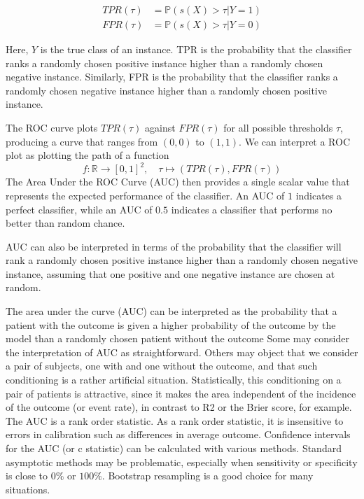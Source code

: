     	\begin{align*}
    		TPR(\tau) &= \mathbb{P}(s(X) > \tau | Y = 1) \\
    		FPR(\tau) &= \mathbb{P}(s(X) > \tau | Y = 0)
    	\end{align*}
	
	Here, $Y$ is the true class of an instance. 
	TPR is the probability that the classifier ranks a randomly chosen positive instance higher than a randomly chosen negative instance. 
	Similarly, FPR is the probability that the classifier ranks a randomly chosen negative instance higher than a randomly chosen positive instance.
    
    	
	The ROC curve plots $TPR(\tau)$ against $FPR(\tau)$ for all possible thresholds $\tau$, producing a curve that ranges from $(0,0)$ to $(1,1)$.
	We can interpret a ROC plot as plotting the path of a function
	\[
		f: \mathbb{R} \to [0,1]^2, \quad  \tau \mapsto (TPR(\tau), FPR(\tau))
	\]
	The Area Under the ROC Curve (AUC) then provides a single scalar value that represents the expected performance of the classifier.
	An AUC of $1$ indicates a perfect classifier, while an AUC of $0.5$ indicates a classifier that performs no better than random chance.
	
	AUC can also be interpreted in terms of the probability that the classifier will rank a randomly chosen positive instance higher than a randomly chosen negative instance,
	assuming that one positive and one negative instance are chosen at random.

	The area under the curve (AUC) can be interpreted as the probability that a patient with the outcome is given a higher probability of the outcome by the model
	than a randomly chosen patient without the outcome
	Some may consider the interpretation of AUC as straightforward. Others may object that we consider a pair of subjects, one with and one without the outcome, 
	and that such conditioning is a rather artificial situation. 
	Statistically, this conditioning on a pair of patients is attractive, since it makes the area independent of the incidence of the outcome (or event rate), 
	in contrast to R2 or the Brier score, for example.
	The AUC is a rank order statistic.
	As a rank order statistic, it is insensitive to errors in calibration such as differences in average outcome.
	Confidence intervals for the AUC (or c statistic) can be calculated with various methods. 
	Standard asymptotic methods may be problematic, especially when sensitivity or specificity is close to $0\%$ or $100\%$. 
	Bootstrap resampling is a good choice for many situations.
	
